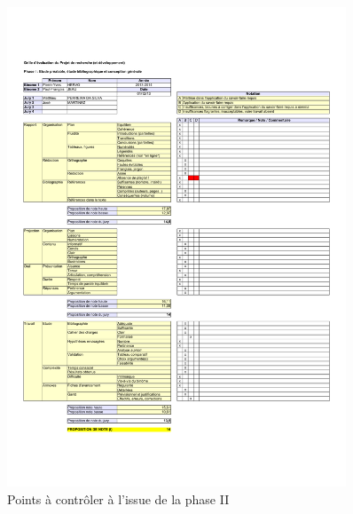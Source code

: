 \documentclass[11pt, french,screen]{report-rd-info}
\begin{document}
\begin{figure}
        \includegraphics[width=0.9\textwidth]{Images/Grille-Evaluation-PRD1}
     \fi
	\caption{Points à contrôler à l'issue de la phase II}
	\label{fig:AutoEvaluationTravailFinal}
\end{figure}
\end{document}
